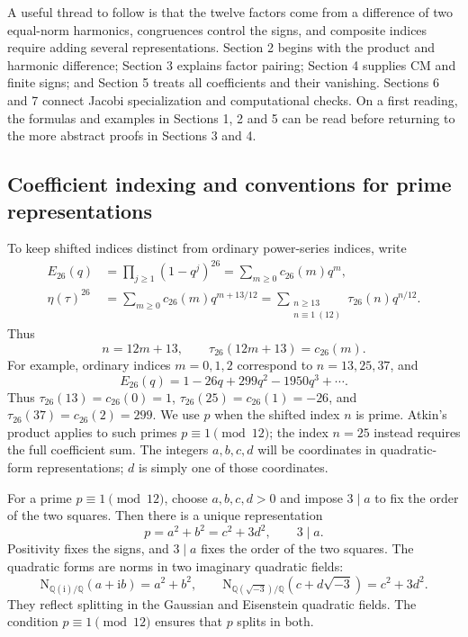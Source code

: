 \documentclass[a4paper,11pt]{article}
\theoremstyle{definition}
\newcommand{\Q}{\mathbb Q}
\newcommand{\norm}{\mathrm N}
\newcommand{\iu}{\mathrm i}
\begin{document}
A useful thread to follow is that the twelve factors come from a difference
of two equal-norm harmonics, congruences control the signs,
and composite indices require adding several representations.
Section 2 begins with the product and harmonic difference;
Section 3 explains factor pairing; Section 4 supplies CM and finite signs;
and Section 5 treats all coefficients and their vanishing.
Sections 6 and 7 connect Jacobi specialization and computational checks.
On a first reading, the formulas and examples in Sections 1, 2 and 5
can be read before returning to the more abstract proofs in Sections 3 and 4.

\subsection{Coefficient indexing and conventions for prime representations}
To keep shifted indices distinct from ordinary power-series indices, write
\begin{align}
 E_{26}(q)&=\prod_{j\geq1}(1-q^j)^{26}
          =\sum_{m\geq0}c_{26}(m)q^m,\label{eq:Euler26}\\
 \eta(\tau)^{26}
 &=\sum_{m\geq0}c_{26}(m)q^{m+13/12}
   =\sum_{\substack{n\geq13\\n\equiv1\ (12)}}
       \tau_{26}(n)q^{n/12}.\label{eq:offset}
\end{align}
Thus
\begin{equation}\label{eq:index}
 n=12m+13,\qquad \tau_{26}(12m+13)=c_{26}(m).
\end{equation}
For example, ordinary indices \(m=0,1,2\) correspond to \(n=13,25,37\), and
\[
 E_{26}(q)=1-26q+299q^2-1950q^3+\cdots.
\]
Thus \(\tau_{26}(13)=c_{26}(0)=1\),
\(\tau_{26}(25)=c_{26}(1)=-26\), and
\(\tau_{26}(37)=c_{26}(2)=299\).
We use \(p\) when the shifted index \(n\) is prime.
Atkin's product applies to such primes \(p\equiv1\pmod{12}\);
the index \(n=25\) instead requires the full coefficient sum.
The integers \(a,b,c,d\) will be coordinates in quadratic-form representations;
\(d\) is simply one of those coordinates.

For a prime \(p\equiv1\pmod{12}\), choose \(a,b,c,d>0\) and impose \(3\mid a\)
to fix the order of the two squares. Then there is a unique representation
\begin{equation}\label{eq:representations}
 p=a^2+b^2=c^2+3d^2,\qquad 3\mid a .
\end{equation}
Positivity fixes the signs, and \(3\mid a\) fixes the order of the two squares.
The quadratic forms are norms in two imaginary quadratic fields:
\[
 \norm_{\Q(\iu)/\Q}(a+\iu b)=a^2+b^2,\qquad
 \norm_{\Q(\sqrt{-3})/\Q}(c+d\sqrt{-3})=c^2+3d^2.
\]
They reflect splitting in the Gaussian and Eisenstein quadratic fields.
The condition \(p\equiv1\pmod{12}\) ensures that \(p\) splits in both.
\end{document}
